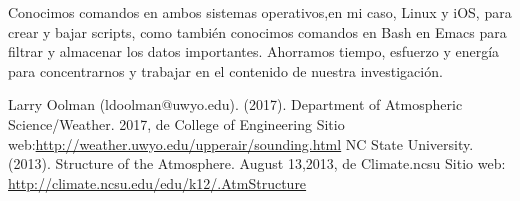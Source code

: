 \documentclass[12pt]{article}
\begin{document}
Conocimos comandos en ambos sistemas operativos,en mi caso, Linux y iOS, para crear y bajar scripts, como tambi\'en conocimos comandos en Bash en Emacs para filtrar y almacenar los datos importantes. Ahorramos tiempo, esfuerzo y energ\'ia para concentrarnos y trabajar en el contenido de nuestra investigaci\'on. 

\begin{thebibliography}{2}
 Larry Oolman (ldoolman@uwyo.edu). (2017). Department of Atmospheric Science/Weather. 2017, de College of Engineering Sitio web:\url{http://weather.uwyo.edu/upperair/sounding.html}
 NC State University. (2013). Structure of the Atmosphere. August 13,2013, de Climate.ncsu Sitio web: \url{http://climate.ncsu.edu/edu/k12/.AtmStructure}

\end{thebibliography}
\end{document}
